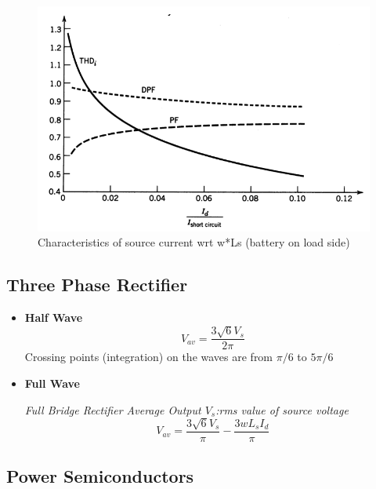 \documentclass[twocolumn, ]{article}
\begin{document}
\begin{figure}[!ht]
	\includegraphics[scale=0.45]{avcur}
	\caption{Characteristics of source current wrt w*Ls (battery on load side)}
\end{figure}

\subsection*{\small Three Phase  Rectifier}

\begin{itemize}



\item \textbf{Half Wave} 
\begin{equation*}
	V_{av}=\dfrac{3 \sqrt{6}V_{s}} {2 \pi}
\end{equation*}
Crossing points (integration) on the waves are from $\pi /6$ to $5 \pi /6$

 

\item \textbf{Full Wave} 

\textit{Full Bridge Rectifier Average Output $V_{s}$:rms value of source voltage}
\begin{equation*}
 	V_{av}=\frac{3 \sqrt{6} V_{s}}{\pi }-\frac{3wL_{s}I_{d}}{\pi }
\end{equation*}





\end{itemize}

\subsection*{\small Power Semiconductors}
\end{document}
